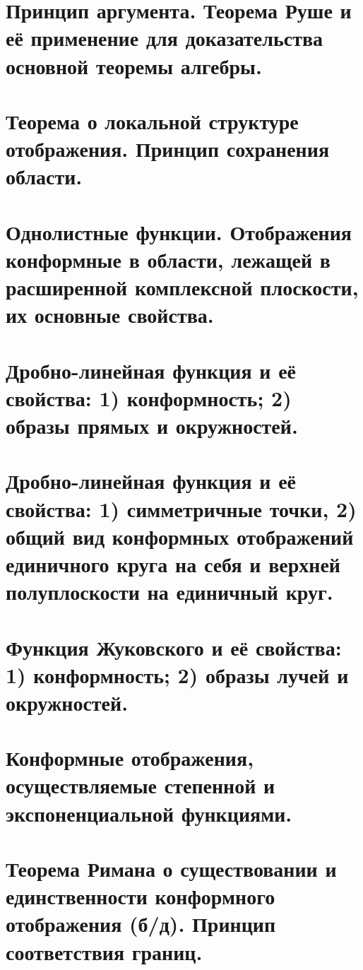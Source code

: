 \section{Принцип аргумента. Теорема Руше и её применение для доказательства основной теоремы алгебры.}


\section{Теорема о локальной структуре отображения. Принцип сохранения области.}

\section{Однолистные функции. Отображения конформные в области, лежащей в расширенной комплексной плоскости, их основные свойства.}


\section{Дробно-линейная функция и её свойства: 1) конформность; 2) образы прямых и окружностей.}


\section{Дробно-линейная функция и её свойства: 1) симметричные точки, 2) общий вид конформных отображений единичного круга на себя и верхней полуплоскости на единичный круг.}


\section{Функция Жуковского и её свойства: 1) конформность; 2) образы лучей и окружностей.}


\section{Конформные отображения, осуществляемые степенной и экспоненциальной функциями.}


\section{Теорема Римана о существовании и единственности конформного отображения (б/д). Принцип соответствия границ.}



